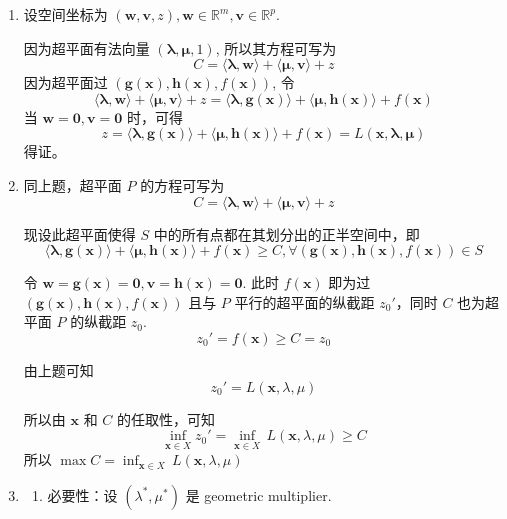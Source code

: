 \documentclass[11pt,letter,notitlepage]{article}
\begin{document}
\begin{solution}
	\begin{enumerate}
		\item 设空间坐标为 $(\mathbf{w},\mathbf{v},z), \mathbf{w}\in\mathbb{R}^m, \mathbf{v}\in\mathbb{R}^p$.

		      因为超平面有法向量 $(\mathbf{\lambda,\mathbf{\mu}},1)$, 所以其方程可写为
		      $$C=\langle \mathbf{\lambda},\mathbf{w} \rangle + \langle \mathbf{\mu},\mathbf{v} \rangle + z$$
		      因为超平面过 $(\mathbf{g}(\mathbf{x}),\mathbf{h}(\mathbf{x}),f(\mathbf{x}))$, 令
		      $$\langle \mathbf{\lambda},\mathbf{w} \rangle + \langle \mathbf{\mu},\mathbf{v} \rangle + z
			      = \langle \mathbf{\lambda},\mathbf{g}(\mathbf{x}) \rangle + \langle \mathbf{\mu},\mathbf{h}(\mathbf{x}) \rangle + f(\mathbf{x})$$
		      当 $\mathbf{w}=\mathbf{0}, \mathbf{v}=\mathbf{0}$ 时，可得
		      $$z = \langle \mathbf{\lambda},\mathbf{g}(\mathbf{x}) \rangle + \langle \mathbf{\mu},\mathbf{h}(\mathbf{x}) \rangle + f(\mathbf{x})
			      = L( \mathbf{x},\mathbf{\lambda}, \mathbf{\mu} )$$
		      得证。
		\item 同上题，超平面 $P$ 的方程可写为
		      $$C=\langle \mathbf{\lambda},\mathbf{w} \rangle + \langle \mathbf{\mu},\mathbf{v} \rangle + z$$

		      现设此超平面使得 $S$ 中的所有点都在其划分出的正半空间中，即
		      $$\langle \mathbf{\lambda},\mathbf{g}(\mathbf{x}) \rangle + \langle \mathbf{\mu},\mathbf{h}(\mathbf{x}) \rangle + f(\mathbf{x}) \geq C, \forall (\mathbf{g}(\mathbf{x}),\mathbf{h}(\mathbf{x}),f(\mathbf{x})) \in S$$

		      令 $\mathbf{w}=\mathbf{g}(\mathbf{x})=\mathbf{0}, \mathbf{v}=\mathbf{h}(\mathbf{x})=\mathbf{0}$.
		      此时 $f(\mathbf{x})$ 即为过 $(\mathbf{g}(\mathbf{x}),\mathbf{h}(\mathbf{x}),f(\mathbf{x}))$ 且与 $P$ 平行的超平面的纵截距 $z_0'$，同时 $C$ 也为超平面 $P$ 的纵截距 $z_0$.
		      $$z_0'=f(\mathbf{x}) \geq C = z_0$$

		      由上题可知
		      $$z_0'=L(\mathbf{x},\lambda,\mu)$$

		      所以由 $\mathbf{x}$ 和 $C$ 的任取性，可知
		      $$\inf_{\mathbf{x}\in X} z_0'
			      =\inf_{\mathbf{x}\in X}\,L(\mathbf{x},\lambda,\mu)
			      \geq C$$
		      所以 $\max{C}=\inf_{\mathbf{x}\in X}\,L(\mathbf{x},\lambda,\mu)$

		\item \begin{enumerate}
			      \item 必要性：设 $(\lambda^*,\mu^*)$ 是 geometric multiplier.


\end{enumerate}
\end{enumerate}
\end{solution}
\end{document}
